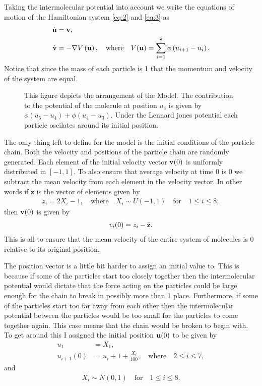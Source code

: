 Taking the intermolecular potential into account we write the equations of motion of the Hamiltonian system \eqref{eq:2} and \eqref{eq:3} as 
\begin{align*}
\dot{\mathbf{u}} &= \mathbf{v},\\
\dot{\mathbf{v}} &=  -\nabla V\left(\mathbf{u} \right), \quad  \text{where} \quad V(\mathbf{u})=\sum_{i=1}^{8}\phi\left( u_{i+1}-u_{i}\right).
\end{align*}
Notice that since the mass of each particle is 1 that the momentum and velocity of the system are equal. \\


 \begin{figure}[h]
\centering
\def\svgscale{0.55}

\caption{This figure depicts the arrangement of the Model. The contribution to the potential of the molecule at position $u_4$ is given by $\phi(u_5-u_4)+\phi(u_4-u_3)$. Under the Lennard jones potential each particle oscilates around its initial position.} \label{figure:4}
\end{figure}

The only thing left to define for the model is the initial conditions of the particle chain. Both the velocity and positions of the particle chain are randomly generated. Each element of the initial velocity vector $\mathbf{v}(0)$ is uniformly distributed in $\left [ -1, 1  \right ]$. To also ensure that average velocity at time 0 is 0 we subtract the mean velocity from each element in the velocity vector. In other words if $\mathbf{z}$ is the vector of elements given by
\begin{align*}
z_i = 2X_i-1,\quad \text{where} \quad     X_i\sim U(-1,1) \quad \text{for} \quad 1\leq i \leq 8, 
\end{align*}
 then $\mathbf{v}(0)$ is given by 
 \begin{align*}
 v_i(0) = z_i - \bar{\mathbf{z}}.
 \end{align*}
This is all to ensure that the mean velocity of the entire system of molecules is 0 relative to its original position. 

The position vector is a little bit harder to assign an initial value to. This is because if some of the particles start too closely together then the intermolecular potential would dictate that the force acting on the particles could be large enough for the chain to break in possibly more than 1 place. Furthermore, if some of the particles start too far away from each other then the intermolecular potential between the particles would be too small for the particles to come together again. This case means that the chain would be broken to begin with. To get around this I assigned the initial position $\mathbf{u}(0)$ to be given by\begin{align*}
u_{1} &= X_1,\\
u_{i+1}(0) &= u_{i}+1+\frac{X_i}{100}, \quad \text{where} \quad  2 \leq i \leq 7,
\end{align*}
and\begin{align*}
X_i \sim N(0,1) \quad \text{for} \quad 1\leq i\leq 8. 
\end{align*}

